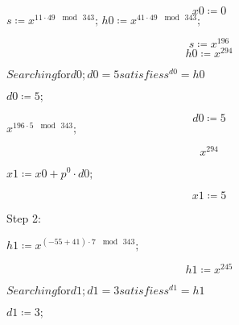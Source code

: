 \documentclass{article}
\begin{document}
\begin{dmath}\label{(2)}
\mathit{x0} \coloneqq 0
\end{dmath}
\mapleinput
{$ \displaystyle s \coloneqq x^{11\cdot 49\,\mod \,343};\,\mathit{h0} \coloneqq x^{41\cdot 49\,\mod \,343}; $}

\begin{dmath*}
s \coloneqq x^{196}
\end{dmath*}
\vspace{-\bigskipamount}
\begin{dmath}\label{(3)}
\mathit{h0} \coloneqq x^{294}
\end{dmath}
\begin{Maple Normal}
{$ \displaystyle \mathit{Searching} \boldsymbol{\mathrm{for}}\mathit{d0} ;\mathit{d0} =5\mathit{satisfies} s^{\mathit{d0}}=\mathit{h0}  $}
\end{Maple Normal}
\begin{Maple Normal}

\end{Maple Normal}
\mapleinput
{$ \displaystyle \mathit{d0} \coloneqq 5; $}

\begin{dmath}\label{(4)}
\mathit{d0} \coloneqq 5
\end{dmath}
\mapleinput
{$ \displaystyle x^{196\cdot 5\,\mod \,343}; $}

\begin{dmath}\label{(5)}
x^{294}
\end{dmath}
\begin{Maple Normal}

\end{Maple Normal}
\mapleinput
{$ \displaystyle \mathit{x1} \coloneqq \mathit{x0} +p^{0}\cdot \mathit{d0} ; $}

\begin{dmath}\label{(6)}
\mathit{x1} \coloneqq 5
\end{dmath}
\begin{Maple Normal}
Step 2:
\end{Maple Normal}
\begin{Maple Normal}

\end{Maple Normal}
\mapleinput
{$ \displaystyle \mathit{h1} \coloneqq x^{\mathit{(-55+41)}\cdot 7\,\mod \,343}; $}

\begin{dmath}\label{(7)}
\mathit{h1} \coloneqq x^{245}
\end{dmath}
\begin{Maple Normal}
{$ \displaystyle \mathit{Searching} \boldsymbol{\mathrm{for}}\mathit{d1} ;\mathit{d1} =3\mathit{satisfies} s^{\mathit{d1}}=\mathit{h1}  $}
\end{Maple Normal}
\begin{Maple Normal}

\end{Maple Normal}
\mapleinput
{$ \displaystyle \mathit{d1} \coloneqq 3; $}
\end{document}
